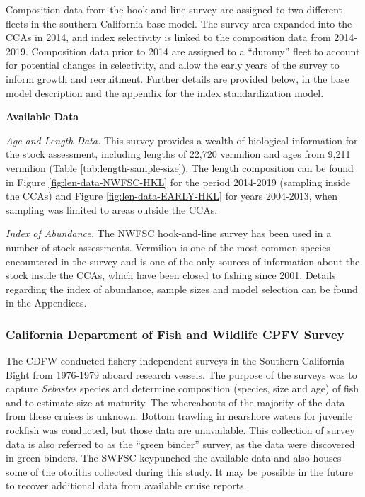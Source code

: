 \documentclass[11pt,
  english,
  a4paper,
]{article}
\begin{document}
Composition data from the hook-and-line survey are assigned to two different fleets in the southern California base model. The survey area expanded into the CCAs in 2014, and index selectivity is linked to the composition data from 2014-2019. Composition data prior to 2014 are assigned to a ``dummy'' fleet to account for potential changes in selectivity, and allow the early years of the survey to inform growth and recruitment. Further details are provided below, in the base model description and the appendix for the index standardization model.

\textbf{Available Data}

\emph{Age and Length Data.} This survey provides a wealth of biological information for the stock assessment, including lengths of 22,720 vermilion and ages from 9,211 vermilion (Table \ref{tab:length-sample-size}). The length composition can be found in Figure \ref{fig:len-data-NWFSC-HKL} for the period 2014-2019 (sampling inside the CCAs) and Figure \ref{fig:len-data-EARLY-HKL} for years 2004-2013, when sampling was limited to areas outside the CCAs.

\emph{Index of Abundance.} The NWFSC hook-and-line survey has been used in a number of stock assessments. Vermilion is one of the most common species encountered in the survey and is one of the only sources of information about the stock inside the CCAs, which have been closed to fishing since 2001. Details regarding the index of abundance, sample sizes and model selection can be found in the Appendices.


\hypertarget{california-department-of-fish-and-wildlife-cpfv-survey}{%
\subsubsection{California Department of Fish and Wildlife CPFV Survey}\label{california-department-of-fish-and-wildlife-cpfv-survey}}

\leavevmode\tagmcend\tagstructend

The CDFW conducted fishery-independent surveys in the Southern California Bight from 1976-1979 aboard research vessels. The purpose of the surveys was to capture \emph{Sebastes} species and determine composition (species, size and age) of fish and to estimate size at maturity. The whereabouts of the majority of the data from these cruises is unknown. Bottom trawling in nearshore waters for juvenile rockfish was conducted, but those data are unavailable. This collection of survey data is also referred to as the ``green binder'' survey, as the data were discovered in green binders. The SWFSC keypunched the available data and also houses some of the otoliths collected during this study. It may be possible in the future to recover additional data from available cruise reports.
\end{document}
